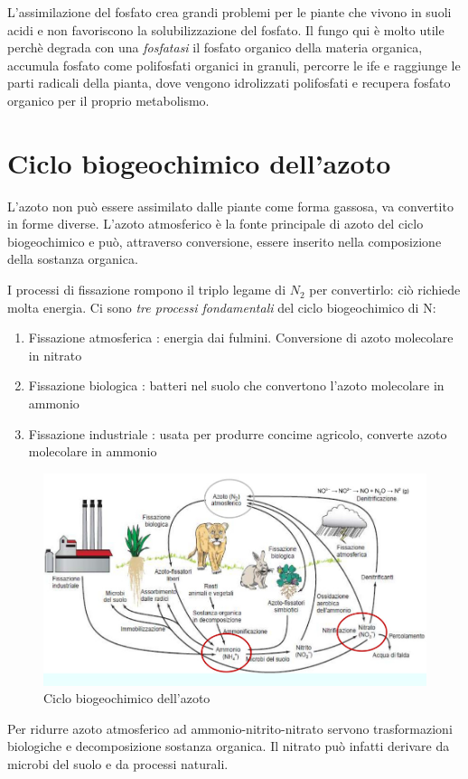 \documentclass[a4paper,12pt]{book}
\begin{document}
L'assimilazione del fosfato crea grandi problemi per le piante che vivono in suoli acidi e non favoriscono la solubilizzazione del fosfato. Il fungo qui è molto utile perchè degrada con una \emph{fosfatasi} il fosfato organico della materia organica, accumula fosfato come polifosfati organici in granuli, percorre le ife e raggiunge le parti radicali della pianta, dove vengono idrolizzati polifosfati e recupera fosfato organico per il proprio metabolismo.   
 
\section{Ciclo biogeochimico dell'azoto}
L'azoto non può essere assimilato dalle piante come forma gassosa, va convertito in forme diverse. L'azoto atmosferico è la fonte principale di azoto del ciclo biogeochimico e può, attraverso conversione, essere inserito nella composizione della sostanza organica. 

I processi di fissazione rompono il triplo legame di $N_{2}$ per convertirlo: ciò richiede molta energia. Ci sono \emph{tre processi fondamentali} del ciclo biogeochimico di N:
\begin{enumerate}
\item{Fissazione atmosferica : energia dai fulmini. Conversione di azoto molecolare in nitrato }
\item{Fissazione biologica : batteri nel suolo che convertono l'azoto molecolare in ammonio}
\item{Fissazione industriale : usata per produrre concime agricolo, converte azoto molecolare in ammonio}
\end{enumerate}
\begin{figure}[H]
\centering
\includegraphics[scale=0.4]{immagini/ciclo.jpg}
\caption{Ciclo biogeochimico dell'azoto}
\end{figure}
Per ridurre azoto atmosferico ad ammonio-nitrito-nitrato servono trasformazioni biologiche e decomposizione sostanza organica. Il nitrato può infatti derivare da microbi del suolo e  da processi naturali.   
 
\end{document}
